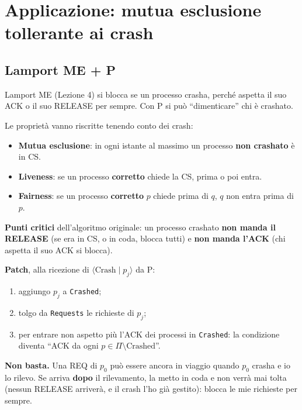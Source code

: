 \section{Applicazione: mutua esclusione tollerante ai crash}

\subsection{Lamport ME + P}

\begin{inbreve}

Lamport ME (Lezione 4) si blocca se un processo crasha, perché aspetta il suo ACK o il suo RELEASE per sempre. Con P si può ``dimenticare'' chi è crashato.

\end{inbreve}

Le proprietà vanno riscritte tenendo conto dei crash:

\begin{itemize}
\tightlist
\item
  \textbf{Mutua esclusione}: in ogni istante al massimo un processo \textbf{non crashato} è in CS.
\item
  \textbf{Liveness}: se un processo \textbf{corretto} chiede la CS, prima o poi entra.
\item
  \textbf{Fairness}: se un processo \textbf{corretto} \(p\) chiede prima di \(q\), \(q\) non entra prima di \(p\).
\end{itemize}

\textbf{Punti critici} dell'algoritmo originale: un processo crashato \textbf{non manda il RELEASE} (se era in CS, o in coda, blocca tutti) e \textbf{non manda l'ACK} (chi aspetta il suo ACK si blocca).

\textbf{Patch}, alla ricezione di \(\langle \text{Crash} \mid p_j \rangle\) da P:

\begin{enumerate}
\def\labelenumi{\arabic{enumi}.}
\tightlist
\item
  aggiungo \(p_j\) a \texttt{Crashed};
\item
  tolgo da \texttt{Requests} le richieste di \(p_j\);
\item
  per entrare non aspetto più l'ACK dei processi in \texttt{Crashed}: la condizione diventa ``ACK da ogni \(p \in \Pi \setminus \text{Crashed}\)''.
\end{enumerate}

\textbf{Non basta.} Una REQ di \(p_0\) può essere ancora in viaggio quando \(p_0\) crasha e io lo rilevo. Se arriva \textbf{dopo} il rilevamento, la metto in coda e non verrà mai tolta (nessun RELEASE arriverà, e il crash l'ho già gestito): blocca le mie richieste per sempre.

